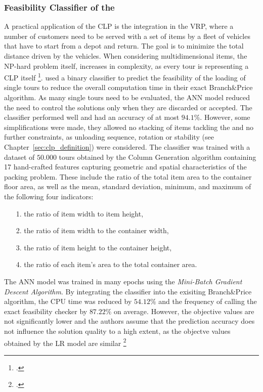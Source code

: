 \subsubsection{Feasibility Classifier of the }
A practical application of the \gls{CLP} is the integration in the \gls{VRP}, where
a number of customers need to be served with a set of items by a fleet of vehicles that have
to start from a depot and return. The goal is to minimize the total distance driven
by the vehicles. When considering multidimensional items, the NP-hard problem itself,
increases in complexity, as every tour is representing a \gls{CLP} itself \footcite[cf.][pp. 1--2]{tamke_branch-and-cut_2024}.
\citeauthor*{zhang_learning-based_2022} used a binary classifier to predict the feasibility of the
loading of single tours to reduce the overall computation time in their exact Branch\&Price
algorithm. As many single tours need to be evaluated, the \gls{ANN} model reduced the need
to control the solutions only when they are discarded or accepted. The classifier
performed well and had an accuracy of at most $94.1\%$. However, some simplifications were made,
they allowed no stacking of items tackling the  and no further constraints,
as unloading sequence, rotation or stability (see Chapter~\ref{sec:clp_definition}) were considered.
The classifier was trained with a dataset of $50.000$ tours obtained by the Column Generation
algorithm containing 17 hand-crafted features capturing geometric
and spatial characteristics of the packing problem. These include the ratio of the total item area
to the container floor area, as well as the mean, standard deviation, minimum, and maximum of
the following four indicators:
\begin{itemize}
    \item[1.] the ratio of item width to item height,
    \item[2.] the ratio of item width to the container width,
    \item[3.] the ratio of item height to the container height,
    \item[4.] the ratio of each item’s area to the total container area.
\end{itemize}
The \gls{ANN} model was trained in many epochs
using the \textit{Mini-Batch Gradient Descent Algorithm}. By integrating the classifier into the
exisiting Branch\&Price algorithm, the CPU time was reduced by $54.12\%$ and the frequency of
calling the exact feasibility checker by $87.22\%$ on average. However, the objective values are not significantly
lower and the authors assume that the prediction accuracy does not influence the solution quality
to a high extent, as the objectve values obtained by the \gls{LR} model are similar \footcite[cf.][pp. 4, 9--15]{zhang_learning-based_2022}

